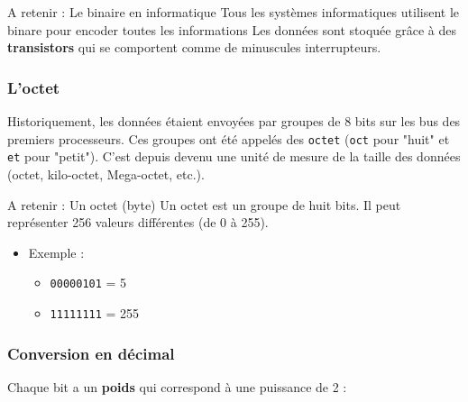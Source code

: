 \begin{UPSTIinfor}{A retenir : Le binaire en informatique}
	Tous les systèmes informatiques utilisent le binare pour encoder toutes les informations
	Les données sont stoquée grâce à des \textbf{transistors} qui se comportent comme de minuscules interrupteurs.
\end{UPSTIinfor}

\subsubsection{L’octet}

Historiquement, les données étaient envoyées par groupes de 8 bits sur les bus des premiers processeurs.
Ces groupes ont été appelés des \texttt{octet} (\texttt{oct} pour "huit" et \texttt{et} pour "petit").
C'est depuis devenu une unité de mesure de la taille des données (octet, kilo-octet, Mega-octet, etc.).

\begin{UPSTIinfor}{A retenir : Un octet (byte)}
	Un octet est un groupe de huit bits. Il peut représenter 256 valeurs différentes (de 0 à 255).
	\begin{itemize}
		\item Exemple :
		      \begin{itemize}
			      \item \texttt{00000101} = 5
			      \item \texttt{11111111} = 255
		      \end{itemize}
	\end{itemize}
\end{UPSTIinfor}

\subsubsection{Conversion en décimal}
Chaque bit a un \textbf{poids} qui correspond à une puissance de 2 :

